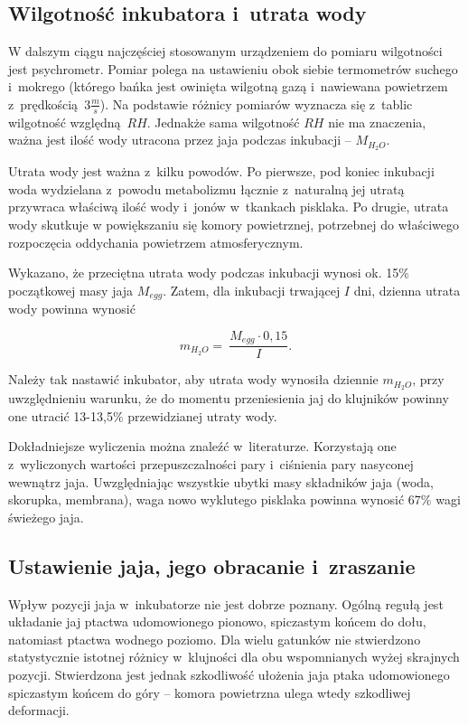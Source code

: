 \subsection{Wilgotność inkubatora i~utrata wody}
W dalszym ciągu najczęściej stosowanym urządzeniem do pomiaru wilgotności jest
psychrometr. Pomiar polega na ustawieniu obok siebie termometrów suchego
i~mokrego (którego bańka jest owinięta wilgotną gazą i~nawiewana powietrzem
z~prędkością~$3\frac{m}{s}$). Na podstawie różnicy pomiarów wyznacza się
z~tablic wilgotność względną~$RH$. Jednakże sama wilgotność $RH$ nie ma
znaczenia, ważna jest ilość wody utracona przez jaja podczas inkubacji --
$M_{H_{2}O}$.

Utrata wody jest ważna z~kilku powodów. Po pierwsze, pod koniec inkubacji woda
wydzielana z~powodu metabolizmu łącznie z~naturalną jej utratą przywraca
właściwą ilość wody i~jonów w~tkankach pisklaka. Po drugie, utrata wody skutkuje
w powiększaniu się komory powietrznej, potrzebnej do właściwego rozpoczęcia
oddychania powietrzem atmosferycznym. 

Wykazano, że przeciętna utrata wody podczas inkubacji wynosi ok. 15\%
początkowej masy jaja $M_{egg}$. Zatem, dla inkubacji trwającej $I$ dni, dzienna
utrata wody powinna wynosić

$$m_{H_{2}O} =~\frac{M_{egg} \cdot 0,15}{I}.$$

Należy tak nastawić inkubator, aby utrata wody wynosiła dziennie $m_{H_{2}O}$,
przy uwzględnieniu warunku, że do momentu przeniesienia jaj do klujników powinny
one utracić 13-13,5\% przewidzianej utraty wody.

Dokładniejsze wyliczenia można znaleźć w~literaturze. Korzystają one
z~wyliczonych wartości przepuszczalności pary i~ciśnienia pary nasyconej
wewnątrz jaja. Uwzględniając wszystkie ubytki masy składników jaja (woda,
skorupka, membrana), waga nowo wyklutego pisklaka powinna wynosić 67\% wagi
świeżego jaja.

\subsection{Ustawienie jaja, jego obracanie i~zraszanie}
Wpływ pozycji jaja w~inkubatorze nie jest dobrze poznany. Ogólną regułą jest
układanie jaj ptactwa udomowionego pionowo, spiczastym końcem do dołu, natomiast
ptactwa wodnego poziomo. Dla wielu gatunków nie stwierdzono statystycznie
istotnej różnicy w~klujności dla obu wspomnianych wyżej skrajnych pozycji.
Stwierdzona jest jednak szkodliwość ułożenia jaja ptaka udomowionego spiczastym
końcem do góry -- komora powietrzna ulega wtedy szkodliwej deformacji. 

